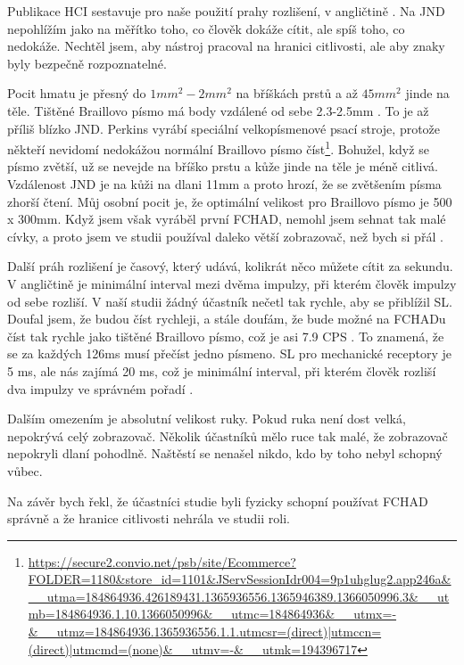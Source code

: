 Publikace HCI sestavuje pro naše použití prahy rozlišení, v angličtině . Na JND nepohlížím jako na měřítko toho, co člověk dokáže cítit, ale spíš toho, co nedokáže.  Nechtěl jsem, aby nástroj pracoval na hranici citlivosti, ale aby znaky byly bezpečně rozpoznatelné.

Pocit hmatu je přesný do ${}1mm^2 - 2mm^2$ na bříškách prstů a až ${}45mm^2$ jinde na těle.  Tištěné Braillovo písmo má body vzdálené od sebe 2.3-2.5mm \citep{brailleauthority}. To je až příliš blízko JND.  Perkins vyrábí speciální velkopísmenové psací stroje, protože někteří nevidomí nedokážou normální Braillovo písmo číst\footnote{\url{https://secure2.convio.net/psb/site/Ecommerce?FOLDER=1180&store_id=1101&JServSessionIdr004=9p1uhglug2.app246a&__utma=184864936.426189431.1365936556.1365946389.1366050996.3&__utmb=184864936.1.10.1366050996&__utmc=184864936&__utmx=-&__utmz=184864936.1365936556.1.1.utmcsr=(direct)|utmccn=(direct)|utmcmd=(none)&__utmv=-&__utmk=194396717}}.  Bohužel, když se písmo zvětší, už se nevejde na bříško prstu a kůže jinde na těle je méně citlivá.  Vzdálenost JND je na kůži na dlani 11mm a proto hrozí, že se zvětšením písma zhorší čtení. Můj osobní pocit je, že optimální velikost pro Braillovo písmo je 500 x 300mm.  Když jsem však vyráběl první FCHAD, nemohl jsem sehnat tak malé cívky, a proto jsem ve studii používal daleko větší zobrazovač, než bych si přál \citep[str. 30-32]{nielsen2008gesture}.

Další práh rozlišení je časový, který udává, kolikrát něco můžete cítit za sekundu.  V angličtině  je minimální interval mezi dvěma impulzy, při kterém člověk impulzy od sebe rozliší. V naší studii žádný účastník nečetl tak rychle, aby se přiblížil SL.  Doufal jsem, že budou číst rychleji, a stále doufám, že bude možné na FCHADu číst tak rychle jako tištěné Braillovo písmo, což je asi 7.9 CPS \citep{wetzel2006studies}.  To znamená, že se za každých 126ms musí přečíst jedno písmeno.  SL pro mechanické receptory je 5 ms, ale nás zajímá 20 ms, což je minimální interval, při kterém člověk rozliší dva impulzy ve správném pořadí \citep[str. 32]{nielsen2008gesture}.

Dalším omezením je absolutní velikost ruky.  Pokud ruka není dost velká, nepokrývá celý zobrazovač.  Několik účastníků mělo ruce tak malé, že zobrazovač nepokryli dlaní pohodlně. Naštěstí se nenašel nikdo, kdo by toho nebyl schopný vůbec.

Na závěr bych řekl, že účastníci studie byli fyzicky schopní používat FCHAD správně a že hranice citlivosti nehrála ve studii roli.

